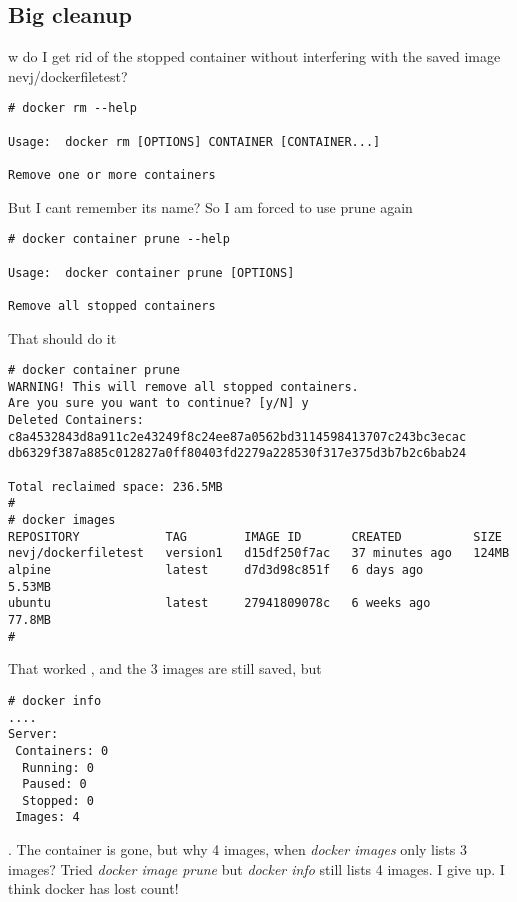 \documentclass{article}  %
\begin{document}
\subsection{Big cleanup}
w do I get rid of the stopped container without interfering with the saved image nevj/dockerfiletest?
\begin{verbatim}
# docker rm --help

Usage:  docker rm [OPTIONS] CONTAINER [CONTAINER...]

Remove one or more containers

\end{verbatim}
 But I cant remember its name? 
So I am forced to use prune again
\begin{verbatim}
# docker container prune --help

Usage:  docker container prune [OPTIONS]

Remove all stopped containers
\end{verbatim}
 That should do it
\begin{verbatim}
# docker container prune
WARNING! This will remove all stopped containers.
Are you sure you want to continue? [y/N] y
Deleted Containers:
c8a4532843d8a911c2e43249f8c24ee87a0562bd3114598413707c243bc3ecac
db6329f387a885c012827a0ff80403fd2279a228530f317e375d3b7b2c6bab24

Total reclaimed space: 236.5MB
# 
# docker images
REPOSITORY            TAG        IMAGE ID       CREATED          SIZE
nevj/dockerfiletest   version1   d15df250f7ac   37 minutes ago   124MB
alpine                latest     d7d3d98c851f   6 days ago       5.53MB
ubuntu                latest     27941809078c   6 weeks ago      77.8MB
# 
\end{verbatim}
That worked , and the 3 images are still saved, but
\begin{verbatim}
# docker info
....
Server:
 Containers: 0
  Running: 0
  Paused: 0
  Stopped: 0
 Images: 4
\end{verbatim}.
The container is gone, but why 4 images, when {\em docker images} only lists 3 images?
Tried {\em docker image prune} but {\em docker info} still lists 4 images. 
I give up. I think docker has lost count!
\end{document}
